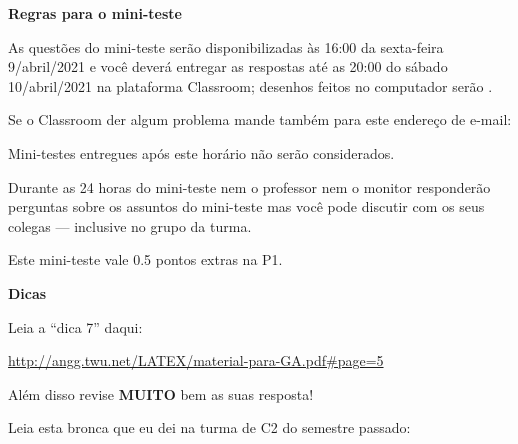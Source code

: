 \documentclass[oneside,12pt]{article}
\begin{document}
\newpage


%

{\bf Regras para o mini-teste}


As questões do mini-teste serão disponibilizadas às 16:00 da
sexta-feira 9/abril/2021 e você deverá entregar as respostas
 até as 20:00 do sábado 10/abril/2021 na
plataforma Classroom; desenhos feitos no computador serão
.

Se o Classroom der algum problema mande também para este endereço de
e-mail:

\ssk


\ssk

Mini-testes entregues após este horário não serão considerados.

Durante as 24 horas do mini-teste nem o professor nem o monitor
responderão perguntas sobre os assuntos do mini-teste mas você pode
discutir com os seus colegas --- inclusive no grupo da turma.

Este mini-teste vale 0.5 pontos extras na P1.


\newpage


{\bf Dicas}

\ssk

Leia a ``dica 7'' daqui:

\ssk

\url{http://angg.twu.net/LATEX/material-para-GA.pdf\#page=5}

\bsk

Além disso revise {\bf MUITO} bem as suas resposta!

Leia esta bronca que eu dei na turma de C2 do semestre passado:
\end{document}
